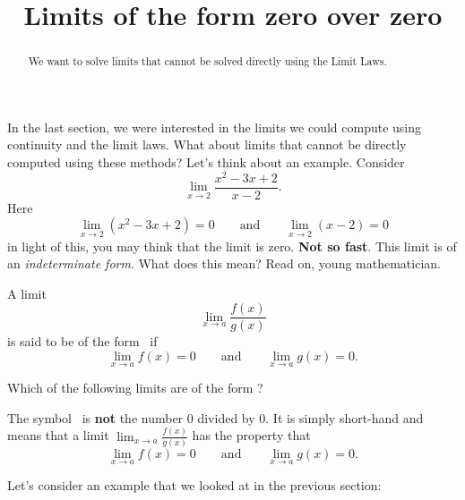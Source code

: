 \documentclass{ximera}
\title[Dig-In:]{Limits of the form zero over zero}
\begin{document}
\begin{abstract}
  We want to solve limits that cannot be solved directly using the
  Limit Laws.
\end{abstract}

\maketitle

In the last section, we were interested in the limits we could compute
using continuity and the limit laws. What about limits that cannot be
directly computed using these methods? Let's think about an example. Consider
\[
\lim_{x\to 2}\frac{x^2-3x+2}{x-2}.
\]
Here 
\[
\lim_{x\to 2}\left(x^2-3x+2\right) = 0\qquad\text{and}\qquad \lim_{x\to
  2}\left(x-2\right) = 0
\]
in light of this, you may think that the limit is zero. \textbf{Not so
  fast}. This limit is of an \textit{indeterminate form}. What does
this mean? Read on, young mathematician.

\begin{definition}
  A limit
  \[
  \lim_{x\to a} \frac{f(x)}{g(x)}
  \]
  is said to be of the form \zeroOverZero\ if
  \[
  \lim_{x\to a} f(x) = 0\qquad\text{and}\qquad \lim_{x\to a} g(x) =0.
  \]
\end{definition}

\begin{question}
  Which of the following limits are of the form \zeroOverZero?
  \begin{selectAll}
  \end{selectAll}
\end{question}

\begin{warning}
  The symbol \zeroOverZero\ is \textbf{not} the number $0$ divided by
  $0$. It is simply short-hand and means that a limit $\lim_{x\to a}
  \frac{f(x)}{g(x)}$ has the property that
  \[
  \lim_{x\to a} f(x) = 0\qquad\text{and}\qquad \lim_{x\to a} g(x) =0.
  \]
\end{warning}


Let's consider an example that we looked at in the previous section:
\end{document}
